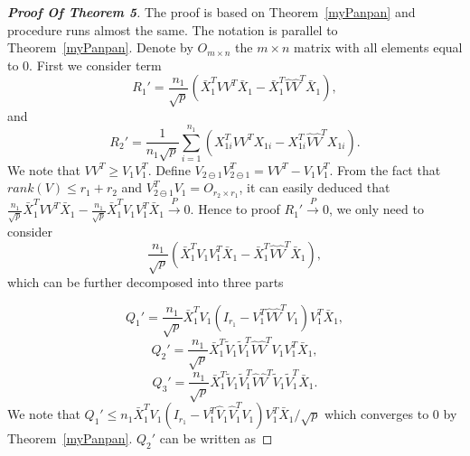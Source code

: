 \begin{proof}[\textbf{Proof Of Theorem 5}]
    The proof is based on Theorem~\ref{myPanpan} and procedure runs almost the same. The notation is parallel to Theorem~\ref{myPanpan}. Denote by $O_{m\times n}$ the $m\times n$ matrix with all elements equal to $0$. First we consider term
\begin{equation*}
    R_1'=\frac{n_1}{\sqrt{p}}(\bar{X}_1^T VV^T\bar{X}_1-\bar{X}_1^T \hat{V}\hat{V}^T\bar{X}_1),
\end{equation*}
and
\begin{equation*}
    R_2'=\frac{1}{n_1\sqrt{p}}\sum_{i=1}^{n_1}(X_{1i}^T VV^T X_{1i}-X_{1i}^T \hat{V}\hat{V}^T X_{1i}).
\end{equation*}
We note that $VV^T\geq V_1 V_1^T$. Define $V_{2\ominus 1}V_{2\ominus 1}^T=VV^T-V_1 V_1^T$. From the fact that $rank(V)\leq r_1+r_2$ and $V_{2\ominus 1}^T V_1=O_{r_2\times r_1}$, it can easily deduced that $\frac{n_1}{\sqrt{p}}\bar{X}_1^T VV^T\bar{X}_1-\frac{n_1}{\sqrt{p}}\bar{X}_1^T V_1V_1^T\bar{X}_1\xrightarrow{P}0$. Hence to proof $R_1'\xrightarrow{P}0$, we only need to consider
\begin{equation*}
\frac{n_1}{\sqrt{p}}(\bar{X}_1^T V_1V_1^T \bar{X}_1-\bar{X}_1^T \hat{V}\hat{V}^T \bar{X}_1),
\end{equation*}
which can be further decomposed into three parts

    \begin{equation*}
        Q_1'=\frac{n_1}{\sqrt{p}}\bar{X}_1^T V_1(I_{r_1}-V_1^T\hat{V}\hat{V}^T V_1)V_1^T \bar{X}_1,
    \end{equation*}
    \begin{equation*}
        Q_2'=\frac{n_1}{\sqrt{p}}\bar{X}_1^T \tilde{V}_1\tilde{V}_1^T\hat{V}\hat{V}^T V_1V_1^T \bar{X}_1,
    \end{equation*}
    \begin{equation*}
        Q_3'=\frac{n_1}{\sqrt{p}}\bar{X}_1^T \tilde{V}_1\tilde{V}_1^T\hat{V}\hat{V}^T \tilde{V}_1\tilde{V}_1^T \bar{X}_1.
    \end{equation*}
We note that $Q_1'\leq n_1\bar{X}_1^T V_1(I_{r_1}-V_1^T\hat{V}_1\hat{V}_1^T V_1)V_1^T \bar{X}_1/\sqrt{p}$ which converges to $0$ by Theorem~\ref{myPanpan}.  $Q_2'$ can be written as


\end{proof}
